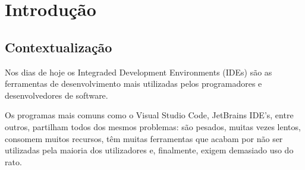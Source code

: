\chapter{Introdução}%
\label{chap:introducao}

\section{Contextualização}
\label{sec:contextualizacao}

Nos dias de hoje os Integraded Development Environments (IDEs) são as ferramentas de desenvolvimento mais utilizadas pelos programadores e desenvolvedores de software.

Os programas mais comuns como o Visual Studio Code, JetBrains IDE's, entre outros, partilham todos dos mesmos problemas: são pesados, muitas vezes lentos, consomem muitos recursos, têm muitas ferramentas que acabam por não ser utilizadas pela maioria dos utilizadores e, finalmente, exigem demasiado uso do rato.

